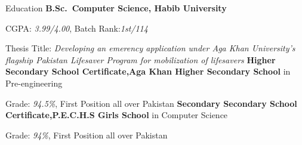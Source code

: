 \begin{rubric}{Education}
\entry*[2019 -- 2023]%
	\textbf{B.Sc.~Computer Science, Habib University}\par
        CGPA: \emph{3.99/4.00}, Batch Rank:\emph{1st/114}\par
        Thesis Title: \emph{Developing an emerency application under Aga Khan University's flagship Pakistan Lifesaver Program for mobilization of lifesavers }
\entry*[2017-2019]%
	\textbf{Higher Secondary School Certificate,Aga Khan Higher Secondary School} in Pre-engineering
	\par Grade: \emph{94.5\%}, First Position all over Pakistan
\entry*[2015 -- 2017]%
	\textbf{Secondary Secondary School Certificate,P.E.C.H.S Girls School} in Computer Science
	\par Grade: \emph{94\%}, First Position all over Pakistan

% 
\end{rubric}